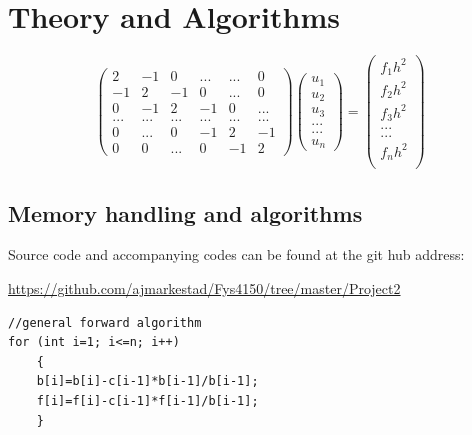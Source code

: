 \documentclass[a4paper,11pt]{article}
\begin{document}
{\section*{Theory and Algorithms}
		\begin{equation}
\begin{pmatrix}
	2 & -1 & 0 & ... & ... & 0 \\
	-1 & 2 & -1 & 0 & ... & 0 \\
	0 & -1 & 2 & -1 & 0 & ... \\
	... & ... & ... & ... & ... & ... \\
	0 & ... & 0 & -1 & 2 & -1 \\
	0 & 0 & ... & 0 & -1 & 2 
	\end{pmatrix} \begin{pmatrix}
	u_1\\
	u_2\\
	u_3\\
	...\\
	...\\
	u_n
	\end{pmatrix} = \begin{pmatrix}
	f_1 h^2 \\
	f_2 h^2 \\
	f_3 h^2 \\
	... \\
	... \\
	f_n h^2 \\
	\end{pmatrix}
\end{equation}		

\subsection{Memory handling and algorithms}

Source code and accompanying codes can be found at the git hub address:

\url{https://github.com/ajmarkestad/Fys4150/tree/master/Project2} 


\begin{lstlisting}
//general forward algorithm
for (int i=1; i<=n; i++)
	{
	b[i]=b[i]-c[i-1]*b[i-1]/b[i-1];
	f[i]=f[i]-c[i-1]*f[i-1]/b[i-1];
	}
\end{lstlisting}

}
\end{document}
